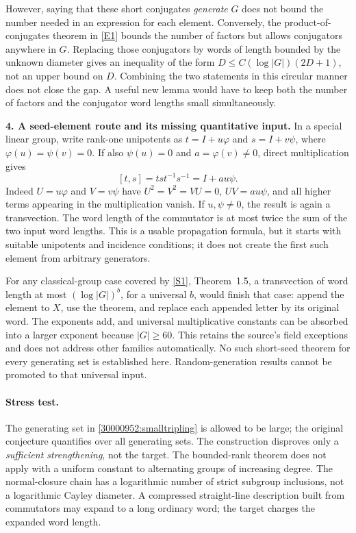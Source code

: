 \documentclass[11pt,a4paper]{article}
\newcommand{\sref}[2]{\hyperlink{source:#1:#2}{[S#2]}}
\newcommand{\eref}[2]{\hyperlink{extra:#1:#2}{[E#2]}}
\numberwithin{equation}{section}
\begin{document}
However, saying that these short conjugates \emph{generate} $G$ does
not bound the number needed in an expression for each element.
Conversely, the product-of-conjugates theorem in \eref{30000952}{1} bounds
the number of factors but allows conjugators anywhere in $G$.
Replacing those conjugators by words of length bounded by the unknown
diameter gives an inequality of the form
$D\le C(\log|G|)(2D+1)$, not an upper bound on $D$.
Combining the two statements in this circular manner does not close the
gap. A useful new lemma would have to keep both the number of factors
and the conjugator word lengths small simultaneously.

\textbf{4. A seed-element route and its missing quantitative input.}
In a special linear group, write rank-one unipotents as
$t=I+u\varphi$ and $s=I+v\psi$, where
$\varphi(u)=\psi(v)=0$. If also $\psi(u)=0$ and
$a=\varphi(v)\ne0$, direct multiplication gives
\begin{equation}\label{30000952:commutator}
 [t,s]=tst^{-1}s^{-1}=I+a u\psi.
\end{equation}
Indeed $U=u\varphi$ and $V=v\psi$ have $U^2=V^2=VU=0$,
$UV=a u\psi$, and all higher terms appearing in the multiplication
vanish. If $u,\psi\ne0$, the result is again a transvection.
The word length of the commutator is at most twice the sum of the two
input word lengths. This is a usable propagation formula, but it starts
with suitable unipotents and incidence conditions; it does not create
the first such element from arbitrary generators.

For any classical-group case covered by \sref{30000952}{1}, Theorem~1.5,
a transvection of word length at most $(\log|G|)^b$, for a universal
$b$, would finish that case: append the element to $X$, use the theorem,
and replace each appended letter by its original word. The exponents
add, and universal multiplicative constants can be absorbed into a
larger exponent because $|G|\ge60$. This retains the source's field
exceptions and does not address other families automatically.
No such short-seed theorem for every generating set is established here.
Random-generation results cannot be promoted to that universal input.

\paragraph{Stress test.}
The generating set in \eqref{30000952:smalltripling} is allowed to be large;
the original conjecture quantifies over all generating sets. The
construction disproves only a \emph{sufficient strengthening}, not the
target. The bounded-rank theorem does not apply with a uniform constant
to alternating groups of increasing degree. The normal-closure chain
has a logarithmic number of strict subgroup inclusions, not a logarithmic
Cayley diameter. A compressed straight-line description built from
commutators may expand to a long ordinary word; the target charges the
expanded word length.
\end{document}
